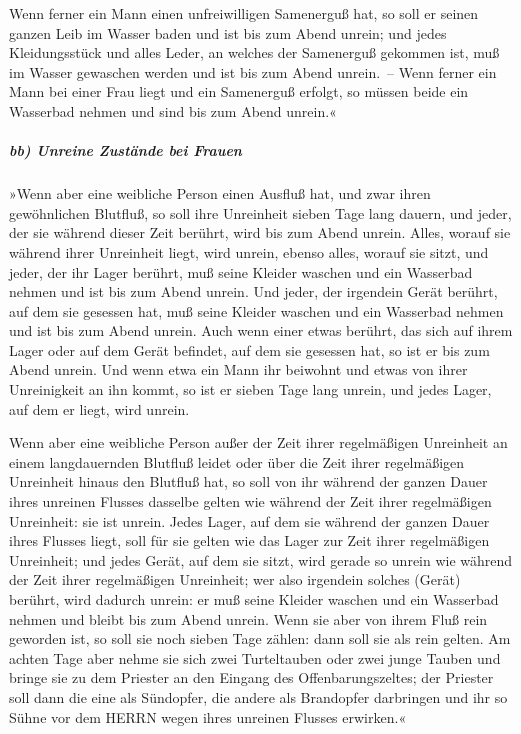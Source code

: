 Wenn ferner ein Mann einen unfreiwilligen Samenerguß hat,
so soll er seinen ganzen Leib im Wasser baden und ist bis zum Abend
unrein; und jedes Kleidungsstück und alles Leder, an
welches der Samenerguß gekommen ist, muß im Wasser gewaschen werden und
ist bis zum Abend unrein.~-- Wenn ferner ein Mann bei
einer Frau liegt und ein Samenerguß erfolgt, so müssen beide ein
Wasserbad nehmen und sind bis zum Abend unrein.«

\hypertarget{bb-unreine-zustuxe4nde-bei-frauen}{%
\subparagraph{bb) Unreine Zustände bei
Frauen}\label{bb-unreine-zustuxe4nde-bei-frauen}}

»Wenn aber eine weibliche Person einen Ausfluß hat, und
zwar ihren gewöhnlichen Blutfluß, so soll ihre Unreinheit sieben Tage
lang dauern, und jeder, der sie während dieser Zeit berührt, wird bis
zum Abend unrein. Alles, worauf sie während ihrer
Unreinheit liegt, wird unrein, ebenso alles, worauf sie sitzt,
und jeder, der ihr Lager berührt, muß seine Kleider
waschen und ein Wasserbad nehmen und ist bis zum Abend unrein.
Und jeder, der irgendein Gerät berührt, auf dem sie
gesessen hat, muß seine Kleider waschen und ein Wasserbad nehmen und ist
bis zum Abend unrein. Auch wenn einer etwas berührt, das
sich auf ihrem Lager oder auf dem Gerät befindet, auf dem sie gesessen
hat, so ist er bis zum Abend unrein. Und wenn etwa ein
Mann ihr beiwohnt und etwas von ihrer Unreinigkeit an ihn kommt, so ist
er sieben Tage lang unrein, und jedes Lager, auf dem er liegt, wird
unrein.

Wenn aber eine weibliche Person außer der Zeit ihrer
regelmäßigen Unreinheit an einem langdauernden Blutfluß leidet oder über
die Zeit ihrer regelmäßigen Unreinheit hinaus den Blutfluß hat, so soll
von ihr während der ganzen Dauer ihres unreinen Flusses dasselbe gelten
wie während der Zeit ihrer regelmäßigen Unreinheit: sie ist unrein.
Jedes Lager, auf dem sie während der ganzen Dauer ihres
Flusses liegt, soll für sie gelten wie das Lager zur Zeit ihrer
regelmäßigen Unreinheit; und jedes Gerät, auf dem sie sitzt, wird gerade
so unrein wie während der Zeit ihrer regelmäßigen Unreinheit;
wer also irgendein solches (Gerät) berührt, wird dadurch
unrein: er muß seine Kleider waschen und ein Wasserbad nehmen und bleibt
bis zum Abend unrein. Wenn sie aber von ihrem Fluß rein
geworden ist, so soll sie noch sieben Tage zählen: dann soll sie als
rein gelten. Am achten Tage aber nehme sie sich zwei
Turteltauben oder zwei junge Tauben und bringe sie zu dem Priester an
den Eingang des Offenbarungszeltes; der Priester soll
dann die eine als Sündopfer, die andere als Brandopfer darbringen und
ihr so Sühne vor dem HERRN wegen ihres unreinen Flusses erwirken.«

